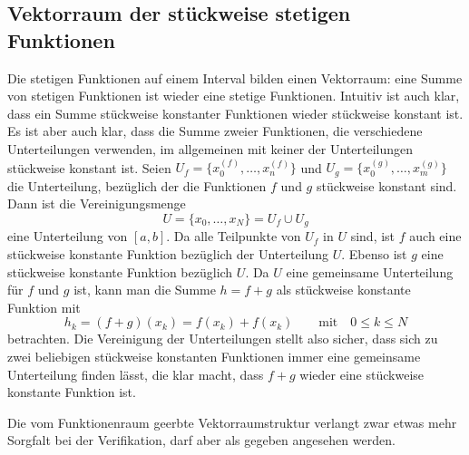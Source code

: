 \subsection{Vektorraum der stückweise stetigen Funktionen}
Die stetigen Funktionen auf einem Interval bilden einen Vektorraum: eine
Summe von stetigen Funktionen ist wieder eine stetige Funktionen.
Intuitiv ist auch klar, dass ein Summe stückweise konstanter Funktionen
wieder stückweise konstant ist.
Es ist aber auch klar, dass die Summe zweier Funktionen, die verschiedene
Unterteilungen verwenden, im allgemeinen mit keiner der Unterteilungen
stückweise konstant ist.
Seien $U_f=\{x_0^{(f)},\dots,x_n^{(f)}\}$ und
$U_g=\{x_0^{(g)},\dots,x_m^{(g)}\}$ die Unterteilung, bezüglich der 
die Funktionen $f$ und $g$ stückweise konstant sind.
Dann ist die Vereinigungsmenge
\[
U= \{x_0,\dots,x_N\} = U_f\cup U_g
\]
eine Unterteilung von $[a,b]$.
Da alle Teilpunkte von $U_f$ in $U$ sind, ist $f$ auch eine stückweise
konstante Funktion bezüglich der Unterteilung $U$. 
Ebenso ist $g$ eine stückweise konstante Funktion bezüglich $U$.
Da $U$ eine gemeinsame Unterteilung für $f$ und $g$ ist, kann man
die Summe $h=f+g$ als stückweise konstante Funktion mit
\[
h_k
=
(f+g)(x_k)
= 
f(x_k) + f(x_k)
\qquad\text{mit}\quad
0\le k\le N
\]
betrachten.
Die Vereinigung der Unterteilungen stellt also sicher, dass sich
zu zwei beliebigen stückweise konstanten Funktionen immer eine
gemeinsame Unterteilung finden lässt, die klar macht, dass $f+g$
wieder eine stückweise konstante Funktion ist.

Die vom Funktionenraum geerbte Vektorraumstruktur verlangt zwar etwas
mehr Sorgfalt bei der Verifikation, darf aber als gegeben angesehen
werden.

